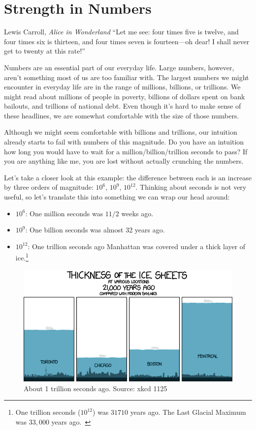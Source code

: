 \chapter{Strength in Numbers}
\label{les:15}

\begin{chapquote}{Lewis Carroll, \textit{Alice in Wonderland}}
\enquote{Let me see: four times five is twelve, and four times six is thirteen, and
four times seven is fourteen—oh dear! I shall never get to twenty at this
rate!}
\end{chapquote}

Numbers are an essential part of our everyday life. Large numbers,
however, aren't something most of us are too familiar with. The largest
numbers we might encounter in everyday life are in the range of
millions, billions, or trillions. We might read about millions of people
in poverty, billions of dollars spent on bank bailouts, and trillions of
national debt. Even though it's hard to make sense of these headlines,
we are somewhat comfortable with the size of those numbers.

Although we might seem comfortable with billions and trillions, our
intuition already starts to fail with numbers of this magnitude. Do you
have an intuition how long you would have to wait for a
million/billion/trillion seconds to pass? If you are anything like me,
you are lost without actually crunching the numbers.

Let's take a closer look at this example: the difference between each is an
increase by three orders of magnitude: $10^6$, $10^9$, $10^{12}$. Thinking about
seconds is not very useful, so let's translate this into something we can wrap
our head around:

\begin{itemize}
  \item $10^6$: One million seconds was $1 1/2$ weeks ago.
  \item $10^9$: One billion seconds was almost 32 years ago.
  \item $10^{12}$: One trillion seconds ago Manhattan was covered under a thick
  layer of ice.\footnote{One trillion seconds ($10^{12}$) was $31710$ years ago. The Last Glacial
  Maximum was $33,000$ years ago.~\cite{wiki:LGM}}
\end{itemize}

\begin{figure}
  \includegraphics{assets/images/xkcd-1125.png}
  \caption{About 1 trillion seconds ago. Source: xkcd 1125}
  \label{fig:xkcd-1125}
\end{figure}


